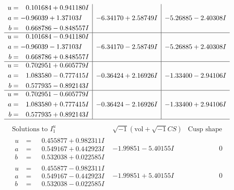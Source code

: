 \documentclass[1p]{elsarticle_modified}
\theoremstyle{definition}
\newcommand{\I}{\sqrt{-1}}
\begin{document}
$$\begin{array}{c|c|c}
\begin{aligned}
u &= \phantom{-}0.101684 + 0.941180 I \\
a &= -0.96039 + 1.37103 I \\
b &= \phantom{-}0.668786 - 0.848557 I\end{aligned}
 & -6.34170 + 2.58749 I & -5.26885 - 2.40308 I \\ \hline\begin{aligned}
u &= \phantom{-}0.101684 - 0.941180 I \\
a &= -0.96039 - 1.37103 I \\
b &= \phantom{-}0.668786 + 0.848557 I\end{aligned}
 & -6.34170 - 2.58749 I & -5.26885 + 2.40308 I \\ \hline\begin{aligned}
u &= \phantom{-}0.702951 + 0.605779 I \\
a &= \phantom{-}1.083580 - 0.777415 I \\
b &= \phantom{-}0.577935 - 0.892143 I\end{aligned}
 & -0.36424 + 2.16926 I & -1.33400 - 2.94106 I \\ \hline\begin{aligned}
u &= \phantom{-}0.702951 - 0.605779 I \\
a &= \phantom{-}1.083580 + 0.777415 I \\
b &= \phantom{-}0.577935 + 0.892143 I\end{aligned}
 & -0.36424 - 2.16926 I & -1.33400 + 2.94106 I\\
 \hline 
 \end{array}$$\newpage$$\begin{array}{c|c|c}  
\text{Solutions to }I^u_{1}& \I (\text{vol} + \sqrt{-1}CS) & \text{Cusp shape}\\
 \hline 
\begin{aligned}
u &= \phantom{-}0.455877 + 0.982311 I \\
a &= \phantom{-}0.549167 + 0.442923 I \\
b &= \phantom{-}0.532038 + 0.022585 I\end{aligned}
 & -1.99851 - 5.40155 I & \phantom{-0.000000 } 0 \\ \hline\begin{aligned}
u &= \phantom{-}0.455877 - 0.982311 I \\
a &= \phantom{-}0.549167 - 0.442923 I \\
b &= \phantom{-}0.532038 - 0.022585 I\end{aligned}
 & -1.99851 + 5.40155 I & \phantom{-0.000000 } 0 \\ \hline\begin{aligned}

\end{aligned}
\end{array}$$
\end{document}
